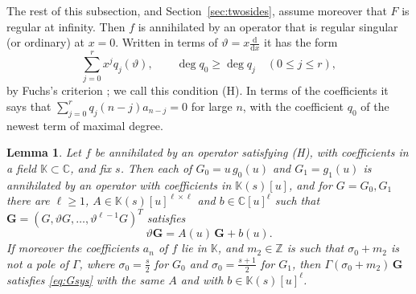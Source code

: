 \documentclass[11pt,reqno]{amsart}
\newtheorem{lemma}[theorem]{Lemma}
\theoremstyle{definition}
\theoremstyle{remark}
\newcommand{\ZZ}{\mathbb{Z}}
\newcommand{\CC}{\mathbb{C}}
\begin{document}
The rest of this subsection, and Section~\ref{sec:twosides}, assume moreover that $F$ is regular at infinity. Then
$f$ is annihilated by an operator that is regular singular (or ordinary) at $x = 0$. Written in terms of $\vartheta = x\frac{\mathrm d}{\mathrm dx}$ it has the form
\begin{equation}\label{eq:thetaform}
  \sum_{j=0}^{r}x^jq_j(\vartheta), \qquad \deg q_0 \ge \deg q_j \quad (0 \le j \le r),
\end{equation}
by Fuchs's criterion \cite[\S15.3]{Inc26}; we call this condition (H). In terms of the coefficients it says that
$\sum_{j=0}^{r}q_j(n-j)a_{n-j} = 0$ for large $n$, with the coefficient $q_0$ of the newest term of maximal degree.

\begin{lemma}\label{lem:kernelhol}
Let $f$ be annihilated by an operator satisfying (H), with coefficients in a field $\mathbb K \subset \CC$, and fix
$s$. Then each of $G_0 = u\,g_0(u)$ and $G_1 = g_1(u)$ is annihilated by an operator with coefficients in
$\mathbb K(s)[u]$, and for $G = G_0, G_1$ there are $\ell \ge 1$, $A \in \mathbb K(s)[u]^{\ell\times\ell}$ and
$b \in \CC[u]^\ell$ such that $\mathbf G = (G, \vartheta G, \dots, \vartheta^{\ell-1}G)^T$ satisfies
\begin{equation}\label{eq:Gsys}
  \vartheta\mathbf G = A(u)\,\mathbf G + b(u).
\end{equation}
If moreover the coefficients $a_n$ of $f$ lie in $\mathbb K$, and $m_2 \in \ZZ$ is such that $\sigma_0 + m_2$ is not
a pole of $\Gamma$, where $\sigma_0 = \frac s2$ for $G_0$ and $\sigma_0 = \frac{s+1}2$ for $G_1$, then
$\Gamma(\sigma_0+m_2)\,\mathbf G$ satisfies \eqref{eq:Gsys} with the same $A$ and with $b \in \mathbb K(s)[u]^\ell$.
\end{lemma}
\end{document}
